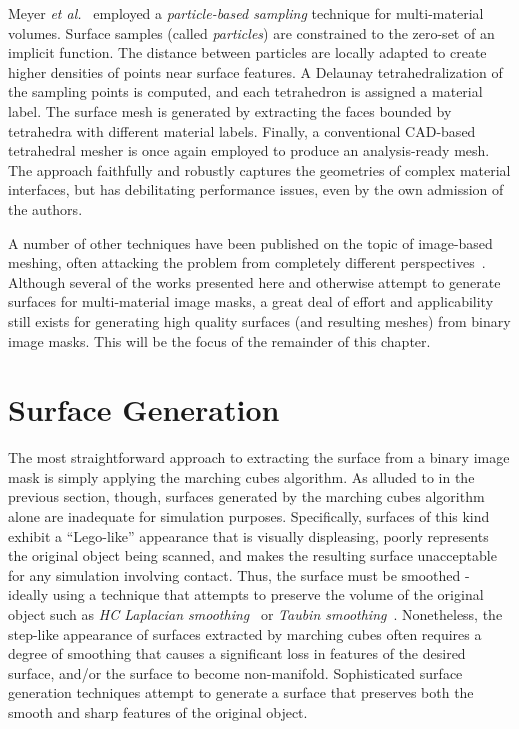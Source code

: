 Meyer \textit{et al.}~\cite{meyer_2008} employed a \textit{particle-based sampling} technique for multi-material volumes. Surface samples (called \textit{particles}) are constrained to the zero-set of an implicit function. The distance between particles are locally adapted to create higher densities of points near surface features. A Delaunay tetrahedralization of the sampling points is computed, and each tetrahedron is assigned a material label. The surface mesh is generated by extracting the faces bounded by tetrahedra with different material labels. Finally, a conventional CAD-based tetrahedral mesher is once again employed to produce an analysis-ready mesh. The approach faithfully and robustly captures the geometries of complex material interfaces, but has debilitating performance issues, even by the own admission of the authors.

A number of other techniques have been published on the topic of image-based meshing, often attacking the problem from completely different perspectives~\cite{bronson_2014,fang_2009,boissonnat_2009,zhao_2016}. Although several of the works presented here and otherwise attempt to generate surfaces for multi-material image masks, a great deal of effort and applicability still exists for generating high quality surfaces (and resulting meshes) from binary image masks. This will be the focus of the remainder of this chapter.

\section{Surface Generation}
\label{Surface Generation}

The most straightforward approach to extracting the surface from a binary image mask is simply applying the marching cubes algorithm. As alluded to in the previous section, though, surfaces generated by the marching cubes algorithm alone are inadequate for simulation purposes. Specifically, surfaces of this kind exhibit a ``Lego-like'' appearance that is visually displeasing, poorly represents the original object being scanned, and makes the resulting surface unacceptable for any simulation involving contact. Thus, the surface must be smoothed - ideally using a technique that attempts to preserve the volume of the original object such as \textit{HC Laplacian smoothing}~\cite{vollmer_1999} or \textit{Taubin smoothing}~\cite{taubin_1995}. Nonetheless, the step-like appearance of surfaces extracted by marching cubes often requires a degree of smoothing that causes a significant loss in features of the desired surface, and/or the surface to become non-manifold. Sophisticated surface generation techniques attempt to generate a surface that preserves both the smooth and sharp features of the original object.

